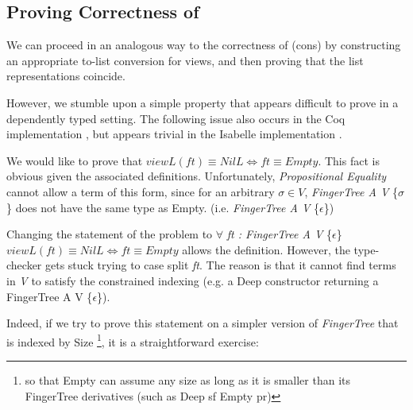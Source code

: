 \documentclass[12pt,twoside,notitlepage]{report}
\begin{document}
\subsection{Proving Correctness of }

We can proceed in an analogous way to the correctness of (cons) by constructing an appropriate to-list conversion for views, and then proving that the list representations coincide.

However, we stumble upon a simple property that appears difficult to prove in a dependently typed setting. The following issue also occurs in the Coq implementation \cite{coq}, but appears trivial in the Isabelle implementation \cite{isabelle}.

We would like to prove that $viewL(ft)\equiv NilL \iff ft \equiv Empty$. This fact is obvious given the associated definitions. Unfortunately, \textit{Propositional Equality} cannot allow a term of this form, since for an arbitrary $\sigma \in V$, \textit{FingerTree A V} \{$\sigma$\} does not have the same type as Empty. (i.e. \textit{FingerTree A V} \{$\epsilon$\})

Changing the statement of the problem to $\forall$ \textit{ft : FingerTree A V} \{$\epsilon$\} $viewL(ft) \equiv NilL \iff ft \equiv Empty$ allows the definition. However, the type-checker gets stuck trying to case split \textit{ft}. The reason is that it cannot find terms in \textit{V} to satisfy the constrained indexing (e.g. a Deep constructor returning a FingerTree A V \{$\epsilon$\}).

Indeed, if we try to prove this statement on a simpler version of \textit{FingerTree} that is indexed by Size \footnote{so that Empty can assume any size as long as it is smaller than its FingerTree derivatives (such as Deep sf Empty pr)}, it is a straightforward exercise: 
\end{document}

